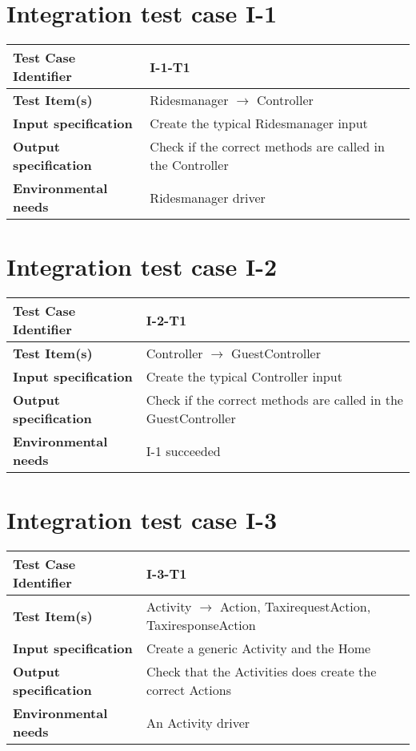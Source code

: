 \section{Integration test case I-1}
\begin{tabular*}{1.23\textwidth}{ l l }
 \textbf{Test Case Identifier}		& I-1-T1 \\
 \hline
 \textbf{Test Item(s)}			& Ridesmanager $\rightarrow$ Controller \\
 \hline
 \textbf{Input specification}		& Create the typical Ridesmanager input \\
 \hline
 \textbf{Output specification}		& Check if the correct methods are called in the Controller \\
 \hline
 \textbf{Environmental needs}		& Ridesmanager driver \\
\end{tabular*}

\section{Integration test case I-2}
\begin{tabular*}{1.23\textwidth}{ l l }
 \textbf{Test Case Identifier}		& I-2-T1 \\
 \hline
 \textbf{Test Item(s)}			& Controller $\rightarrow$ GuestController \\
 \hline
 \textbf{Input specification}		& Create the typical Controller input \\
 \hline
 \textbf{Output specification}		& Check if the correct methods are called in the GuestController \\
 \hline
 \textbf{Environmental needs}		& I-1 succeeded \\
\end{tabular*}

\section{Integration test case I-3}
\begin{tabular*}{1.23\textwidth}{ l l }
 \textbf{Test Case Identifier}		& I-3-T1 \\
 \hline
 \textbf{Test Item(s)}			& Activity $\rightarrow$ Action, TaxirequestAction, TaxiresponseAction \\
 \hline
 \textbf{Input specification}		& Create a generic Activity and the Home \\
 \hline
 \textbf{Output specification}		& Check that the Activities does create the correct Actions\\
 \hline
 \textbf{Environmental needs}		& An Activity driver \\
\end{tabular*}

